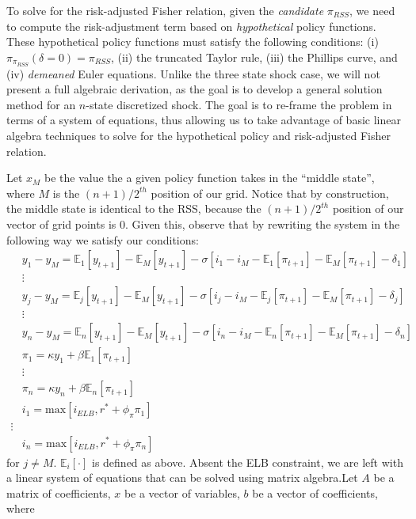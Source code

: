 \documentclass[11pt]{article}
\begin{document}
\begin{singlespace}
		To solve for the risk-adjusted Fisher relation, given the \textit{candidate} $\pi_{RSS}$, we need to compute the risk-adjustment term based on \textit{hypothetical} policy functions. These hypothetical policy functions must satisfy the following conditions: (i) $\pi_{\pi_{RSS}}(\delta=0)=\pi_{RSS}$, (ii) the truncated Taylor rule, (iii) the Phillips curve,  and (iv) \textit{demeaned} Euler equations. Unlike the three state shock case, we will not present a full algebraic derivation, as the goal is to develop a general solution method for an $n$-state discretized shock. The goal is to re-frame the problem in terms of a system of equations, thus allowing us to take advantage of basic linear algebra techniques to solve for the hypothetical policy and risk-adjusted Fisher relation. 
		
		Let $x_{M}$ be the value the a given policy function takes in the ``middle state'', where $M$ is the $(n+1)/2^{th}$ position of our grid. Notice that by construction, the middle state is identical to the RSS, because the $(n+1)/2^{th}$ position of our vector of grid points is $0$.  Given this, observe that by rewriting the system in the following way we satisfy our conditions:
		\begin{align*}
		& y_{1} - y_{M} = \mathbb{E}_1[y_{t+1}]  - \mathbb{E}_M[y_{t+1}] - \sigma\left[i_1 - i_M  - \mathbb{E}_1[\pi_{t+1}] - \mathbb{E}_M[\pi_{t+1}] - \delta_1\right] \\
		&\vdots \nonumber\\
		& y_{j} - y_{M} = \mathbb{E}_j[y_{t+1}]  - \mathbb{E}_M[y_{t+1}] - \sigma\left[i_j - i_M  - \mathbb{E}_j[\pi_{t+1}] - \mathbb{E}_M[\pi_{t+1}] - \delta_j\right] \\
		&\vdots \nonumber\\
		& y_{n} - y_{M} = \mathbb{E}_n[y_{t+1}]  - \mathbb{E}_M[y_{t+1}] - \sigma\left[i_n - i_M  - \mathbb{E}_n[\pi_{t+1}] - \mathbb{E}_M[\pi_{t+1}] - \delta_n\right] \\ 
		& \pi_1  = \kappa y_1 + \beta\mathbb{E}_1[\pi_{t+1}]\\
		&\vdots \nonumber\\
		& \pi_n  = \kappa y_n + \beta\mathbb{E}_n[\pi_{t+1}]\\
		& i_1 = \text{max}\left[i_{ELB},r^*  + \phi_{\pi}\pi_1\right]\\
		\vdots \nonumber\\
		& i_n = \text{max}\left[i_{ELB},r^*  + \phi_{\pi}\pi_n\right]
		\end{align*}
		for $j \neq M$. $\mathbb{E}_i[\cdot]$ is defined as above. Absent the ELB constraint, we are left with a linear system of equations that can be solved using matrix algebra.Let $A$ be a matrix of coefficients, $x$ be a vector of variables, $b$ be a vector of coefficients, where 
		

\end{singlespace}
\end{document}
